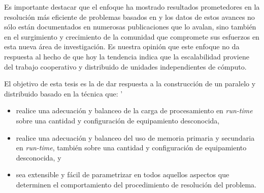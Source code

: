 Es importante destacar que el enfoque \pfolio ha mostrado resultados
prometedores en la resolución más eficiente de problemas basados en \sat y los
datos de estos avances no sólo están documentados en numerosas publicaciones
que lo avalan, sino también en el surgimiento y crecimiento de la comunidad
que compromete sus esfuerzos en esta nueva área de investigación.
 Es nuestra opinión que este enfoque no da respuesta al hecho
de que hoy la tendencia indica que la escalabilidad proviene del trabajo
cooperativo y distribuido de unidades independientes de cómputo.

El objetivo de esta tesis es la de dar respuesta a la construcción de un \ssolver paralelo y distribuido basado en la técnica \gp que: '
\begin{itemize}
\item realice una adecuación y balanceo de la carga de procesamiento en \emph
{run-time} sobre una cantidad y configuración de equipamiento desconocida,
\item realice una adecuación y balanceo del uso de memoria primaria y
secundaria en \emph{run-time}, también sobre una cantidad y configuración de
equipamiento desconocida, y 
\item sea extensible y fácil de parametrizar en
todos aquellos aspectos que determinen el comportamiento del procedimiento de
resolución del problema. 
\end{itemize}

